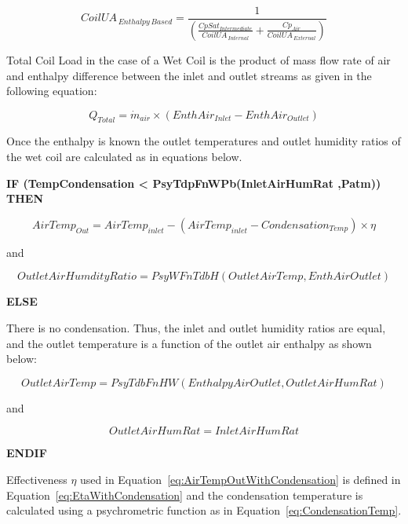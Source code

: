 \begin{equation}
CoilU{A_{\,Enthalpy\,Based}} = \frac{1}{{\left( {\frac{{CpSa{t_{Intermediate}}}}{{CoilU{A_{\,Internal}}}} + \frac{{C{p_{Air}}}}{{CoilU{A_{\,External}}}}} \right)}}
\label{eq:CoilUAEnthalpyBased}
\end{equation}

Total Coil Load in the case of a Wet Coil is the product of mass flow rate of air and enthalpy difference between the inlet and outlet streams as given in the following equation:

\begin{equation}
{Q_{Total}} = {\dot{m}_{air}} \times (EnthAi{r_{Inlet}} - EnthAi{r_{Outlet}})
\end{equation}

Once the enthalpy is known the outlet temperatures and outlet humidity ratios of the wet coil are calculated as in equations below.

\textbf{IF (TempCondensation \textless{} PsyTdpFnWPb(InletAirHumRat ,Patm)) THEN}

\begin{equation}
AirTem{p_{Out}} = AirTem{p_{inlet}} - (AirTem{p_{inlet}} - Condensatio{n_{Temp}}) \times \eta
\label{eq:AirTempOutWithCondensation}
\end{equation}

and

\begin{equation}
OutletAirHumdityRatio = PsyWFnTdbH(OutletAirTemp,EnthAirOutlet)
\end{equation}

\textbf{ELSE}

There is no condensation.  Thus, the inlet and outlet humidity ratios are equal, and the outlet temperature is a function of the outlet air enthalpy as shown below:

\begin{equation}
OutletAirTemp = PsyTdbFnHW(EnthalpyAirOutlet, OutletAirHumRat)
\end{equation}

and

\begin{equation}
OutletAirHumRat = InletAirHumRat
\end{equation}

\textbf{ENDIF}

Effectiveness \(\eta\) used in Equation~\ref{eq:AirTempOutWithCondensation} is defined in Equation~\ref{eq:EtaWithCondensation} and the condensation temperature is calculated using a psychrometric function as in Equation~\ref{eq:CondensationTemp}.

